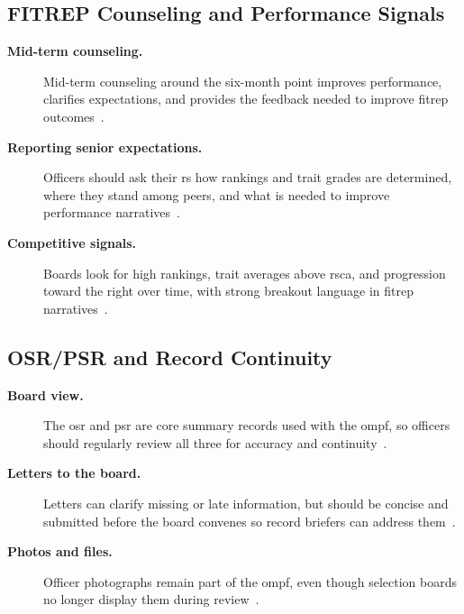 \documentclass[../main.tex]{subfiles}
\begin{document}
\subsection{FITREP Counseling and Performance Signals}
\begin{description}
  \item[\textbf{Mid-term counseling.}] Mid-term counseling around the six-month point improves performance,
  clarifies expectations, and provides the feedback needed to improve \ac{fitrep} outcomes~\autocite{edo-5-2-3-career-topics-2025,BUPERSINST-1610-10H-2025}.
  \item[\textbf{Reporting senior expectations.}] Officers should ask their \ac{rs} how rankings and trait
  grades are determined, where they stand among peers, and what is needed to improve performance
  narratives~\autocite{edo-5-2-3-career-topics-2025}.
  \item[\textbf{Competitive signals.}] Boards look for high rankings, trait averages above \ac{rsca}, and
  progression toward the right over time, with strong breakout language in \ac{fitrep} narratives~\autocite{edo-5-2-3-career-topics-2025}.
\end{description}

\subsection{OSR/PSR and Record Continuity}
\begin{description}
  \item[\textbf{Board view.}] The \ac{osr} and \ac{psr} are core summary records used with the \ac{ompf}, so
  officers should regularly review all three for accuracy and continuity~\autocite{edo-5-2-3-career-topics-2025,MyNavyHR-Officer-Record-Update-2026}.
  \item[\textbf{Letters to the board.}] Letters can clarify missing or late information, but should be concise
  and submitted before the board convenes so record briefers can address them~\autocite{edo-5-2-3-career-topics-2025}.
  \item[\textbf{Photos and files.}] Officer photographs remain part of the \ac{ompf}, even though selection
  boards no longer display them during review~\autocite{edo-5-2-3-career-topics-2025,MyNavyHR-Officer-Record-Update-2026}.
\end{description}
\end{document}

